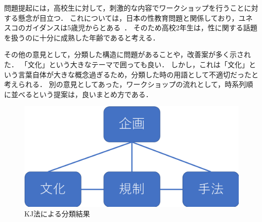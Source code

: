 \documentclass[uplatex,a4paper]{jsarticle}
\begin{document}
問題提起には，高校生に対して，刺激的な内容でワークショップを行うことに対する懸念が目立つ．
これについては，日本の性教育問題と関係しており，ユネスコのガイダンスは5歳児からとある~\cite{40021294461}．
そのため高校2年生は，性に関する話題を扱うのに十分に成熟した年齢であると考える．

その他の意見として，分類した構造に問題があることや，改善案が多く示された．
「文化」という大きなテーマで囲っても良い．
しかし，これは「文化」という言葉自体が大きな概念過ぎるため，分類した時の用語として不適切だったと考えられる．
別の意見としてあった，ワークショップの流れとして，時系列順に並べるという提案は，良いまとめ方である．

\begin{figure}[htb]
\begin{center}
    \includegraphics[width=14cm]{figs/propose.png}
\end{center}
\caption{KJ法による分類結果}
\label{fig:propose}
\end{figure}




\end{document}
